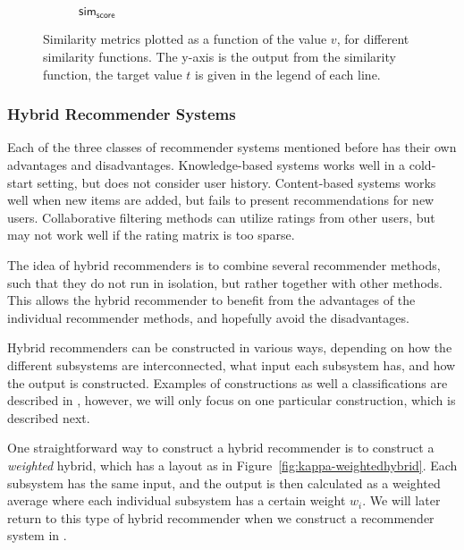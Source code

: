 \begin{figure}[ht]
\begin{subfigure}[b]{0.33\linewidth}
{
		}
		\caption{$\mathsf{sim_\text{score}}$}
		\label{fig:kappa-simscoreplot}
	\end{subfigure}%
	\caption{Similarity metrics plotted as a function of the value $v$, for different similarity functions. The y-axis is the output from the similarity function, the target value $t$ is given in the legend of each line.}
	\label{fig:kappa-similarityfunctions}
\end{figure}

\subsubsection{Hybrid Recommender Systems}
\label{sec:kappa-hybridrecommenders}

Each of the three classes of recommender systems mentioned before has their own advantages and disadvantages.
Knowledge-based systems works well in a cold-start setting, but does not consider user history.
Content-based systems works well when new items are added, but fails to present recommendations for new users.
Collaborative filtering methods can utilize ratings from other users, but may not work well if the rating matrix is too sparse.

The idea of hybrid recommenders is to combine several recommender methods, such that they do not run in isolation, but rather together with other methods.
This allows the hybrid recommender to benefit from the advantages of the individual recommender methods, and hopefully avoid the disadvantages.

Hybrid recommenders can be constructed in various ways, depending on how the different subsystems are interconnected, what input each subsystem has, and how the output is constructed.
Examples of constructions as well a classifications are described in \cite{burke:2002}, however, we will only focus on one particular construction, which is described next.

One straightforward way to construct a hybrid recommender is to construct a \emph{weighted} hybrid, which has a layout as in Figure~\ref{fig:kappa-weightedhybrid}.
Each subsystem has the same input, and the output is then calculated as a weighted average where each individual subsystem has a certain weight $w_i$.
We will later return to this type of hybrid recommender when we construct a recommender system in .

